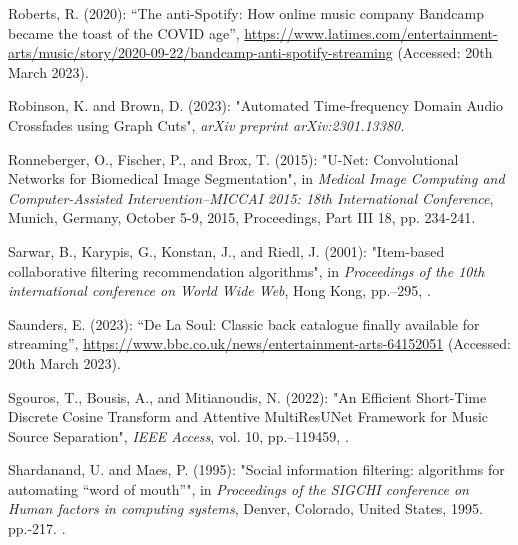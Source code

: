 \documentclass[11pt,titlepage,oneside]{book}
\begin{document}
\begin{thebibliography}{97}
	Roberts, R. (2020): \enquote{The anti-{Spotify}: {How} online music company
		{Bandcamp} became the toast of the {COVID} age},
	\urlprefix\url{https://www.latimes.com/entertainment-arts/music/story/2020-09-22/bandcamp-anti-spotify-streaming} (Accessed: 20th March 2023).

	Robinson, K. and Brown, D. (2023): "Automated {Time}-frequency {Domain}
		{Audio} {Crossfades} using {Graph} {Cuts}", \textit{arXiv preprint arXiv:2301.13380.}
	
	Ronneberger, O., Fischer, P., and Brox, T. (2015): "U-{Net}:
		{Convolutional} {Networks} for {Biomedical} {Image} {Segmentation}", in \textit{Medical Image Computing and Computer-Assisted Intervention–MICCAI 2015: 18th International Conference}, Munich, Germany, October 5-9, 2015, Proceedings, Part III 18, pp. 234-241. 
	
	Sarwar, B., Karypis, G., Konstan, J., and Riedl, J. (2001): "Item-based
		collaborative filtering recommendation algorithms", in \textit{Proceedings of
		the 10th international conference on {World} {Wide} {Web}}, Hong Kong, pp.--295, .
	
	Saunders, E. (2023): \enquote{De {La} {Soul}: {Classic} back catalogue finally
		available for streaming}, \urlprefix\url{https://www.bbc.co.uk/news/entertainment-arts-64152051} (Accessed: 20th March 2023).
	
	Sgouros, T., Bousis, A., and Mitianoudis, N. (2022): "An {Efficient}
		{Short}-{Time} {Discrete} {Cosine} {Transform} and {Attentive} {MultiResUNet}
		{Framework} for {Music} {Source} {Separation}", \textit{IEEE Access}, vol. 10,
	pp.--119459, .
	
	Shardanand, U. and Maes, P. (1995): "Social information filtering:
		algorithms for automating “word of mouth”", in \textit{Proceedings of the
		{SIGCHI} conference on {Human} factors in computing systems},
	Denver, Colorado, United States, 1995. pp.-217.
	.
	

\end{thebibliography}
\end{document}
